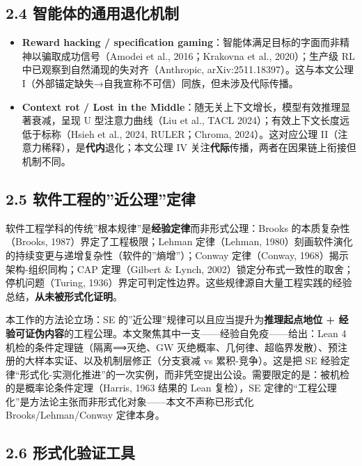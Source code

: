 \documentclass[
]{ctexart}
\providecommand{\tightlist}{%
  \setlength{\itemsep}{0pt}\setlength{\parskip}{0pt}}
\begin{document}
\subsection{2.4
智能体的通用退化机制}\label{ux667aux80fdux4f53ux7684ux901aux7528ux9000ux5316ux673aux5236}

\begin{itemize}
\tightlist
\item
  \textbf{Reward hacking / specification
  gaming}：智能体满足目标的字面而非精神以骗取成功信号（Amodei et al.,
  2016；Krakovna et al., 2020）；生产级 RL
  中已观察到自然涌现的失对齐（Anthropic,
  arXiv:2511.18397）。这与本文公理
  I（外部锚定缺失→自我宣称不可信）同族，但未涉及代际传播。
\item
  \textbf{Context rot / Lost in the
  Middle}：随无关上下文增长，模型有效推理显著衰减，呈现 U
  型注意力曲线（Liu et al., TACL 2024）；有效上下文长度远低于标称（Hsieh
  et al., 2024, RULER；Chroma, 2024）。这对应公理
  II（注意力稀释），是\textbf{代内}退化；本文公理 IV
  关注\textbf{代际}传播，两者在因果链上衔接但机制不同。
\end{itemize}

\subsection{2.5
软件工程的''近公理''定律}\label{ux8f6fux4ef6ux5de5ux7a0bux7684ux8fd1ux516cux7406ux5b9aux5f8b}

软件工程学科的传统''根本规律''是\textbf{经验定律}而非形式公理：Brooks
的本质复杂性（Brooks, 1987）界定了工程极限；Lehman 定律（Lehman,
1980）刻画软件演化的持续变更与递增复杂性（软件的''熵增''）；Conway
定律（Conway, 1968）揭示架构-组织同构；CAP 定理（Gilbert \& Lynch,
2002）锁定分布式一致性的取舍；停机问题（Turing,
1936）界定可判定性边界。这些规律源自大量工程实践的经验总结，\textbf{从未被形式化证明}。

本工作的方法论立场：SE
的''近公理''规律可以且应当提升为\textbf{推理起点地位 +
经验可证伪内容}的工程公理。本文聚焦其中一支------经验自免疫------给出：Lean
4 机检的条件定理链（隔离⟹灭绝、GW
灭绝概率、几何律、超临界发散）、预注册的大样本实证、以及机制层修正（分支衰减
vs 累积-竞争）。这是把 SE
经验定律``形式化-实测化推进''的一次实例，而非凭空提出公设。需要限定的是：被机检的是概率论条件定理（Harris,
1963 结果的 Lean 复检），SE
定律的``工程公理化''是方法论主张而非形式化对象------本文不声称已形式化
Brooks/Lehman/Conway 定律本身。

\subsection{2.6
形式化验证工具}\label{ux5f62ux5f0fux5316ux9a8cux8bc1ux5de5ux5177}
\end{document}

